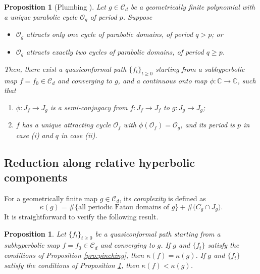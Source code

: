 \documentclass[a4paper,reqno,times, 11pt]{amsart}
\newtheorem{proposition}[theorem]{Proposition}
\theoremstyle{remark}
\theoremstyle{plain}
\numberwithin{equation}{section}
\def\CCCC{\mathscr C}
\def\C{\mbox{$\mathbb C$}}
\begin{document}
	\begin{proposition}[Plumbing \textup{\cite[Theorem 1.6]{CT2}}]\label{pro:plumbing2}
		Let $g\in\CCCC_d$ be a geometrically finite polynomial with a unique parabolic  cycle $\mathcal{O}_{g}$ of period $p$. Suppose 
		\begin{itemize}
			\item[(i)] $\mathcal{O}_g$ attracts only one cycle of parabolic domains, of period $q>p$; or
			\item[(ii)] $\mathcal{O}_g$ attracts exactly two  cycles of parabolic domains, of period $q\geq p$.
		\end{itemize}
		Then, there exist a quasiconformal path $\{f_t\}_{t\geq0}$ starting from a subhyperbolic map $f=f_0\in \CCCC_d$ and converging to $g$,  and a continuous onto map $\phi:\C\to\C$, such that
		\begin{enumerate}
			\item $\phi: J_f\to J_g$ is a semi-conjugacy from $f:J_f\to J_f$ to $g:J_g\to J_g$;\vspace{2pt}
			\item $f$ has a unique attracting  cycle $\mathcal{O}_f$  with $\phi(\mathcal{O}_f)=\mathcal{O}_g$, and its period  is $p$ in case (i) and $q$ in case (ii).
		\end{enumerate}
	\end{proposition}
	


\subsection{Reduction along relative hyperbolic components}


For a geometrically finite map $g\in \CCCC_d$, its \emph{complexity}  is defined as
\[\kappa(g)=\#\{\text{all periodic Fatou domains of $g$}\}+\#\big(C_g\cap J_g\big).\]
It is straightforward to verify the following result.


\begin{proposition}\label{pro:decrease}
	Let $\{f_t\}_{t\geq0}$ be a quasiconformal path starting from  a subhyperbolic map $f=f_0\in\CCCC_d$ and converging to $g$. If $g$ and $\{f_t\}$ satisfy the conditions of Proposition \ref{pro:pinching}, then $\kappa(f)=\kappa(g)$. If $g$ and $\{f_t\}$ satisfy the conditions of Proposition \ref{pro:plumbing2}, then $\kappa(f)<\kappa(g)$.
\end{proposition}
\end{document}
